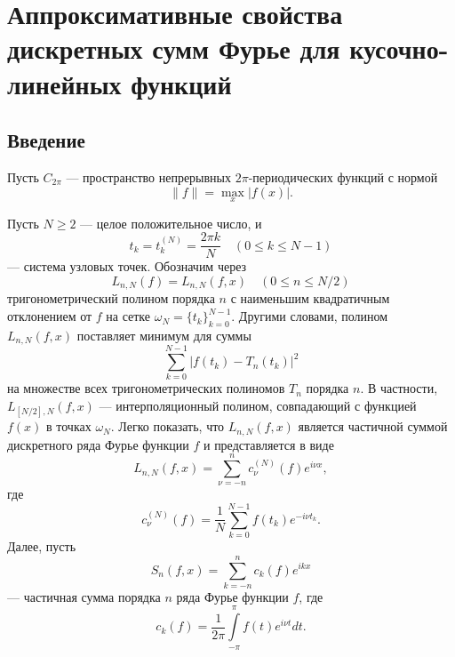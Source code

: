 \chapter{Аппроксимативные свойства дискретных сумм Фурье для кусочно-линейных функций}

\section{Введение}
Пусть $C_{2\pi}$ --- пространство непрерывных $2\pi$-периодических функций с нормой
\begin{equation}
\|f\| = \max_x |f(x)|.
\end{equation}

Пусть $N \geq 2$ --- целое положительное число, и
\begin{equation*}
  t_k = t_k^{(N)} = \frac{2\pi k}{N} \quad (0 \leq k \leq N-1)
\end{equation*}
--- система узловых точек. Обозначим через
\begin{equation*}
  L_{n,N}(f) = L_{n,N}(f,x) \quad (0 \leq n \leq N/2)
\end{equation*}
тригонометрический полином порядка $n$ с наименьшим квадратичным отклонением от $f$ на сетке
$\omega_N=\{t_k\}_{k=0}^{N-1}$. Другими словами, полином $L_{n,N}(f,x)$ поставляет минимум для
суммы
\begin{equation*}
  \sum\limits_{k=0}^{N-1}|f(t_k)-T_n(t_k)|^2
\end{equation*}
на множестве всех тригонометрических полиномов $T_n$ порядка $n$.
В частности, $L_{[N/2],N}(f,x)$ --- интерполяционный полином, совпадающий с функцией $f(x)$ в
точках $\omega_N$.
Легко показать, что $L_{n,N}(f,x)$ является частичной суммой дискретного ряда Фурье функции $f$ и представляется в виде
\begin{equation*}
  L_{n,N}(f,x) = \sum\limits_{\nu = -n}^{n} c_\nu^{(N)}(f) e^{i\nu x},
\end{equation*}
где
\begin{equation*}
  c_\nu^{(N)}(f) = \frac{1}{N}\sum\limits_{k=0}^{N-1} f(t_k)e^{-i\nu t_k}.
\end{equation*}
Далее, пусть
\begin{equation*}
S_n(f,x) = \sum\limits_{k=-n}^{n}c_k(f)e^{ikx}
\end{equation*}
--- частичная сумма порядка $n$ ряда Фурье функции $f$, где
\begin{equation*}
  c_k(f) = \frac{1}{2\pi}\int\limits_{-\pi}^{\pi}f(t)e^{i\nu t} dt.
\end{equation*}
